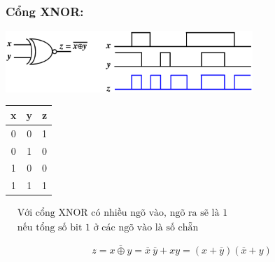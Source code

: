 \subsubsection{Cổng XNOR:}
\begin{center}
    \includegraphics[width = 0.7\textwidth]{./local/image/26.png}
\end{center}
\begin{table}[h!]
    \centering
    \begin{tabular}{|cc|c|}
    \hline
    \textbf{x} & \textbf{y} & \textbf{z} \\ \hline
    0          & 0          & 1                      \\ 
    0          & 1          & 0                      \\ 
    1          & 0          & 0                      \\ 
    1          & 1          & 1                      \\ \hline
    \end{tabular} \qquad 
    $\begin{aligned}
        &\text{Với cổng XNOR có nhiều ngõ vào, ngõ ra sẽ là 1}\\
        &\text{nếu tổng số bit 1 ở các ngõ vào là số chẵn}
    \end{aligned}$
\end{table}
\[
    z = \overline{x \oplus y} = \overline{x}\ \overline{y} +xy = (x+\overline{y})(\overline{x} + y)
\]